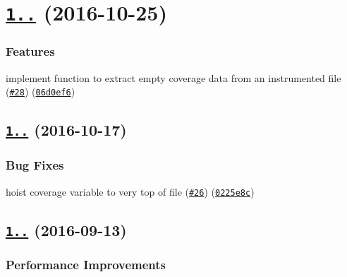 \label{_1.2.0}%
 \section*{\href{https://github.com/istanbuljs/istanbul-lib-instrument/compare/v1.1.4...v1.2.0}{\tt 1..} (2016-\/10-\/25)}

\subsubsection*{Features}


\begin{DoxyItemize}
\item implement function to extract empty coverage data from an instrumented file (\href{https://github.com/istanbuljs/istanbul-lib-instrument/issues/28}{\tt \#28}) (\href{https://github.com/istanbuljs/istanbul-lib-instrument/commit/06d0ef6}{\tt 06d0ef6})
\end{DoxyItemize}

\label{_1.1.4}%
 \subsection*{\href{https://github.com/istanbuljs/istanbul-lib-instrument/compare/v1.1.3...v1.1.4}{\tt 1..} (2016-\/10-\/17)}

\subsubsection*{Bug Fixes}


\begin{DoxyItemize}
\item hoist coverage variable to very top of file (\href{https://github.com/istanbuljs/istanbul-lib-instrument/issues/26}{\tt \#26}) (\href{https://github.com/istanbuljs/istanbul-lib-instrument/commit/0225e8c}{\tt 0225e8c})
\end{DoxyItemize}

\label{_1.1.3}%
 \subsection*{\href{https://github.com/istanbuljs/istanbul-lib-instrument/compare/v1.1.2...v1.1.3}{\tt 1..} (2016-\/09-\/13)}

\subsubsection*{Performance Improvements}


